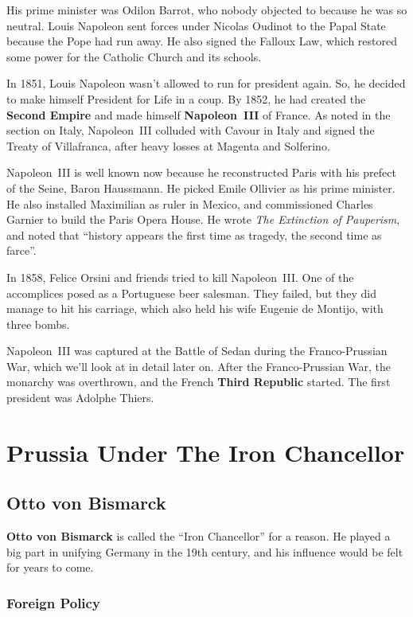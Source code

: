 His prime minister was Odilon Barrot, who nobody objected to because he was so neutral.
Louis Napoleon sent forces under Nicolas Oudinot to the Papal State because the Pope had run away.
He also signed the Falloux Law, which restored some power for the Catholic Church and its schools.

In 1851, Louis Napoleon wasn't allowed to run for president again.
So, he decided to make himself President for Life in a coup.
By 1852, he had created the \textbf{Second Empire} and made himself \textbf{Napoleon~III} of France.
As noted in the section on Italy, Napoleon~III colluded with Cavour in Italy and signed the Treaty of Villafranca,
after heavy losses at Magenta and Solferino.

Napoleon~III is well known now because he reconstructed Paris with his prefect of the Seine, Baron Haussmann.
He picked Emile Ollivier as his prime minister.
He also installed Maximilian as ruler in Mexico, and commissioned Charles Garnier to build the Paris Opera House.
He wrote \textit{The Extinction of Pauperism},
and noted that ``history appears the first time as tragedy, the second time as farce''.

In 1858, Felice Orsini and friends tried to kill Napoleon~III\@.
One of the accomplices posed as a Portuguese beer salesman.
They failed, but they did manage to hit his carriage, which also held his wife Eugenie de Montijo, with three bombs.

Napoleon~III was captured at the Battle of Sedan during the Franco-Prussian War,
which we'll look at in detail later on.
After the Franco-Prussian War, the monarchy was overthrown, and the French \textbf{Third Republic} started.
The first president was Adolphe Thiers.


\section{Prussia Under The Iron Chancellor}

\subsection*{Otto von Bismarck}

\textbf{Otto von Bismarck} is called the ``Iron Chancellor'' for a reason.
He played a big part in unifying Germany in the 19th century, and his influence would be felt for years to come.

\subsubsection*{Foreign Policy}

